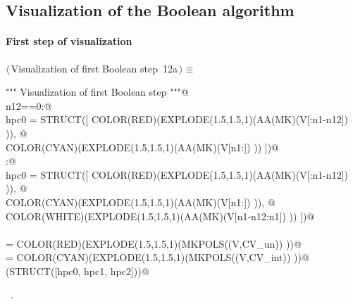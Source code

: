 \documentclass[11pt,oneside]{article}	%
\begin{document}

\subsection{Visualization of the Boolean algorithm}

\paragraph{First step of visualization}

\begin{flushleft} \small
\begin{minipage}{\linewidth} \label{scrap35}
\protect{}$\langle\,$Visualization of first Boolean step\nobreak\ {\footnotesize 12a}$\,\rangle\equiv$
\vspace{-1ex}
\begin{list}{}{} \item
\mbox{}\verb@""" Visualization of first Boolean step  """@\\
\mbox{}\verb@if n12==0:@\\
\mbox{}\verb@   hpc0 = STRUCT([ COLOR(RED)(EXPLODE(1.5,1.5,1)(AA(MK)(V[:n1-n12]) )), @\\
\mbox{}\verb@            COLOR(CYAN)(EXPLODE(1.5,1.5,1)(AA(MK)(V[n1:]) )) ])@\\
\mbox{}\verb@else:@\\
\mbox{}\verb@   hpc0 = STRUCT([ COLOR(RED)(EXPLODE(1.5,1.5,1)(AA(MK)(V[:n1-n12]) )), @\\
\mbox{}\verb@            COLOR(CYAN)(EXPLODE(1.5,1.5,1)(AA(MK)(V[n1:]) )), @\\
\mbox{}\verb@            COLOR(WHITE)(EXPLODE(1.5,1.5,1)(AA(MK)(V[n1-n12:n1]) )) ])@\\
\mbox{}\verb@@\\
\mbox{} = COLOR(RED)(EXPLODE(1.5,1.5,1)(MKPOLS((V,CV_un)) ))@\\
\mbox{} = COLOR(CYAN)(EXPLODE(1.5,1.5,1)(MKPOLS((V,CV_int)) ))@\\
\mbox{}\verb@VIEW(STRUCT([hpc0, hpc1, hpc2]))@\\
\mbox{}\verb@@{\NWsep}
\end{list}
\vspace{-1ex}
\footnotesize\addtolength{\baselineskip}{-1ex}
\begin{list}{}{\setlength{\itemsep}{-\parsep}\setlength{\itemindent}{-\leftmargin}}
\item \NWtxtMacroRefIn\ .
\end{list}
\end{minipage}\\[4ex]
\end{flushleft}
\end{document}
